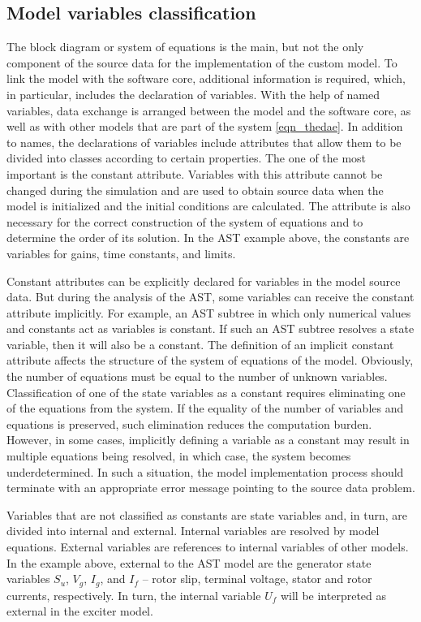 \documentclass[lettersize,journal]{IEEEtran}
\begin{document}
\subsection{Model variables classification} \label{sec_varclass}
The block diagram or system of equations is the main, but not the only component of the source data for the implementation 
of the custom model. To link the model with the software core, additional information is required, which, in particular, 
includes the declaration of variables. With the help of named variables, data exchange is arranged between 
the model and the software core, as well as with other models that are part of the system \eqref{eqn_thedae}. 
In addition to names, the declarations of variables include attributes that allow them to be divided into classes according to
certain properties. The one of the most important is the constant attribute. Variables with this attribute cannot be changed during the
simulation and are used to obtain source data when the model is initialized and the initial conditions are calculated. 
The attribute is also necessary for the correct construction of the system of equations and to determine the order of its solution. In the AST example above, the constants are variables for gains, time constants, and limits.

Constant attributes can be explicitly declared for variables in the model source data. But during the analysis
of the AST, some variables can receive the constant attribute implicitly. For example, an AST subtree in which only 
numerical values and constants act as variables is constant. If such an AST subtree resolves a state variable, then it will 
also be a constant. The definition of an implicit constant attribute affects the structure of the system of equations of the model.
Obviously, the number of equations must be equal to the number of unknown variables. Classification of one of the state variables 
as a constant requires eliminating one of the equations from the system. If the equality of the number of variables and 
equations is preserved, such elimination reduces the computation burden. However, in some cases, implicitly defining 
a variable as a constant may result in multiple equations being resolved, in which case, the system becomes underdetermined. 
In such a situation, the model implementation process should terminate with an appropriate error message pointing to the source data
problem.

Variables that are not classified as constants are state variables and, in turn, are divided into internal and external. 
Internal variables are resolved by model equations. External variables are references to internal variables of other models. 
In the example above, external to the AST model are the generator state variables \(S_u\), \(V_g\), \(I_g\), and \(I_f\) – 
rotor slip, terminal voltage, stator and rotor currents, respectively. In turn, the internal variable \(U_f\) will be interpreted as
external in the exciter model.
\end{document}
